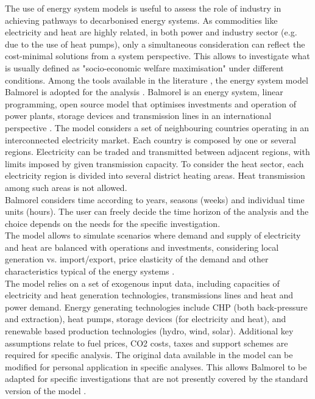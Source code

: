 \documentclass[review]{elsarticle}
\begin{document}
The use of energy system models is useful to assess the role of industry in achieving pathways to decarbonised energy systems. As commodities like electricity and heat are highly related, in both power and industry sector (e.g. due to the use of heat pumps), only a simultaneous consideration can reflect the cost-minimal solutions from a system perspective. This allows to investigate what is usually defined as "socio-economic welfare maximisation" under different conditions. 
Among the tools available in the literature \cite{Connolly2010}, the energy system model Balmorel is adopted for the analysis \cite{balmorel}.
Balmorel is an energy system, linear programming, open source model that optimises investments and operation of power plants, storage devices and transmission lines in an international perspective \cite{Ravn2001}. 
The model considers a set of neighbouring countries operating in an interconnected electricity market. Each country is composed by one or several regions. Electricity can be traded and transmitted between adjacent regions, with limits imposed by given transmission capacity. 
To consider the heat sector, each electricity region is divided into several district heating areas. Heat transmission among such areas is not allowed.  
\\
Balmorel considers time according to years, seasons (weeks) and individual time units (hours). 
The user can freely decide the time horizon of the analysis and the choice depends on the needs for the specific investigation. 
\\
The model allows to simulate scenarios where demand and supply of electricity and heat are balanced with operations and investments, considering local generation vs. import/export, price elasticity of the demand and other characteristics typical of the energy systems \cite{Munster2012}. 
\\
The model relies on a set of exogenous input data, including capacities of electricity and heat generation technologies, transmissions lines and heat and power demand. 
Energy generating technologies include CHP (both back-pressure and extraction), heat pumps, storage devices (for electricity and heat), and renewable based production technologies (hydro, wind, solar).
Additional key assumptions relate to fuel prices, CO2 costs, taxes and support schemes are required for specific analysis.
The original data available in the model can be modified for personal application in specific analyses. This allows Balmorel to be adapted for specific investigations that are not presently covered by the standard version of the model \cite{Wiese}.
\end{document}
